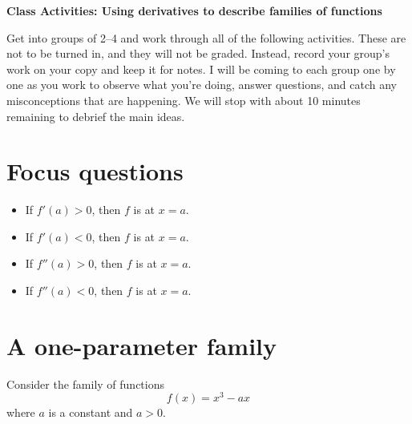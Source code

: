 \documentclass[11pt]{article}
\def\blank{\underline{\hspace{1in}}}
\begin{document}
	
	\thispagestyle{empty}
	\renewcommand{\headrulewidth}{0.0pt}
	\thispagestyle{fancy}
	\lfoot{}
	\cfoot{}
	\rfoot{}	
	
	\vspace*{0in}

		\begin{center}
			\begin{large}
			\textbf{Class Activities: Using derivatives to describe families of functions} \\
			\end{large}
		\end{center}
	
Get into groups of 2--4 and work through all of the following activities. These are not to be turned in, and they will not be graded. Instead, record your group's work on your copy and keep it for notes. I will be coming to each group one by one as you work to observe what you're doing, answer questions, and catch any misconceptions that are happening. We will stop with about 10 minutes remaining to debrief the main ideas.

\section{Focus questions}

\begin{itemize}
	\item If $f'(a) > 0$, then $f$ is \blank at $x=a$. 
	\item If $f'(a) < 0$, then $f$ is \blank at $x=a$. 
	\item If $f''(a) > 0$, then $f$ is \blank at $x=a$.
	\item If $f''(a) <  0$, then $f$ is \blank at $x=a$.
\end{itemize}

\section{A one-parameter family} 

Consider the family of functions 
\[ f(x) = x^3 - ax \]
where $a$ is a constant and $a > 0$. 
\end{document}
